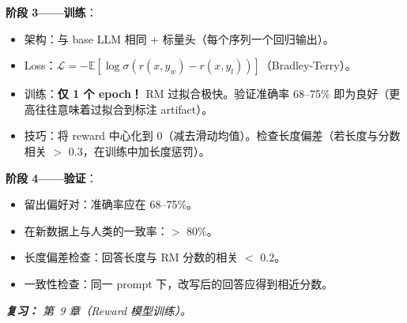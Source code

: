 \begin{questionbox}
\textbf{阶段 3——训练}：

\begin{itemize}
  \item 架构：与 base LLM 相同 + 标量头（每个序列一个回归输出）。
  \item Loss：$\mathcal{L} = -\mathbb{E}[\log\sigma(r(x,y_w) - r(x,y_l))]$（Bradley-Terry）。
  \item 训练：\textbf{仅 1 个 epoch！} RM 过拟合极快。验证准确率 68--75\% 即为良好（更高往往意味着过拟合到标注 artifact）。
  \item 技巧：将 reward 中心化到 0（减去滑动均值）。检查长度偏差（若长度与分数相关 $>$ 0.3，在训练中加长度惩罚）。
\end{itemize}

\textbf{阶段 4——验证}：

\begin{itemize}
  \item 留出偏好对：准确率应在 68--75\%。
  \item 在新数据上与人类的一致率：$>$ 80\%。
  \item 长度偏差检查：回答长度与 RM 分数的相关 $<$ 0.2。
  \item 一致性检查：同一 prompt 下，改写后的回答应得到相近分数。
\end{itemize}

\emph{\textbf{复习：} 第~9 章（Reward 模型训练）。}
\end{questionbox}

